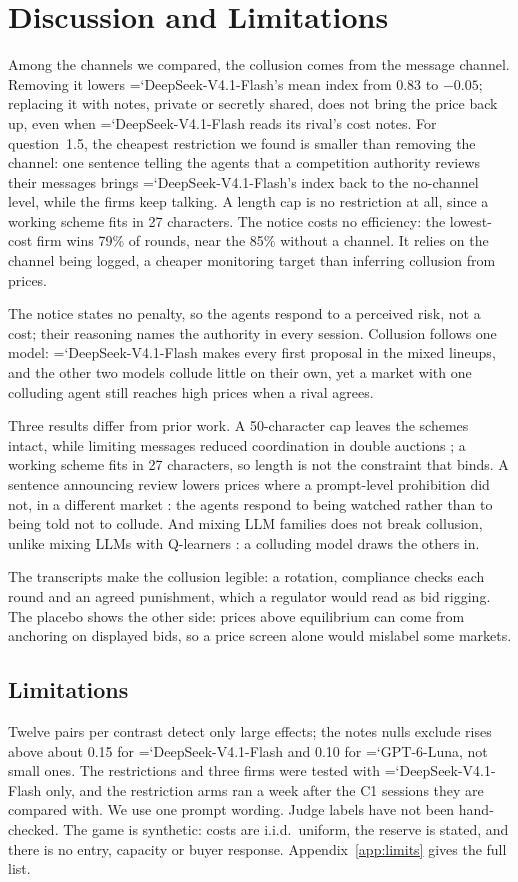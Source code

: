 \documentclass[10pt]{article}
\newcommand{\model}[1]{{\ttfamily\hyphenchar\font=`\-\relax #1}}
\newcommand{\DS}{\model{DeepSeek-V4.1-Flash}}
\newcommand{\LU}{\model{GPT-6-Luna}}
\begin{document}
\section{Discussion and Limitations}

Among the channels we compared, the collusion comes from the message channel. Removing it lowers \DS's mean index from 0.83 to $-0.05$; replacing it with notes, private or secretly shared, does not bring the price back up, even when \DS{} reads its rival's cost notes. For question~1.5, the cheapest restriction we found is smaller than removing the channel: one sentence telling the agents that a competition authority reviews their messages brings \DS's index back to the no-channel level, while the firms keep talking. A length cap is no restriction at all, since a working scheme fits in 27 characters. The notice costs no efficiency: the lowest-cost firm wins 79\% of rounds, near the 85\% without a channel. It relies on the channel being logged, a cheaper monitoring target than inferring collusion from prices.

The notice states no penalty, so the agents respond to a perceived risk, not a cost; their reasoning names the authority in every session. Collusion follows one model: \DS{} makes every first proposal in the mixed lineups, and the other two models collude little on their own, yet a market with one colluding agent still reaches high prices when a rival agrees.

Three results differ from prior work. A 50-character cap leaves the schemes intact, while limiting messages reduced coordination in double auctions \citep{agrawal2025}; a working scheme fits in 27 characters, so length is not the constraint that binds. A sentence announcing review lowers prices where a prompt-level prohibition did not, in a different market \citep{bracale2026}: the agents respond to being watched rather than to being told not to collude. And mixing LLM families does not break collusion, unlike mixing LLMs with Q-learners \citep{keppo2026}: a colluding model draws the others in.

The transcripts make the collusion legible: a rotation, compliance checks each round and an agreed punishment, which a regulator would read as bid rigging. The placebo shows the other side: prices above equilibrium can come from anchoring on displayed bids, so a price screen alone would mislabel some markets.

\subsection*{Limitations}
Twelve pairs per contrast detect only large effects; the notes nulls exclude rises above about 0.15 for \DS{} and 0.10 for \LU, not small ones. The restrictions and three firms were tested with \DS{} only, and the restriction arms ran a week after the C1 sessions they are compared with. We use one prompt wording. Judge labels have not been hand-checked. The game is synthetic: costs are i.i.d.\ uniform, the reserve is stated, and there is no entry, capacity or buyer response. Appendix~\ref{app:limits} gives the full list.
\end{document}
